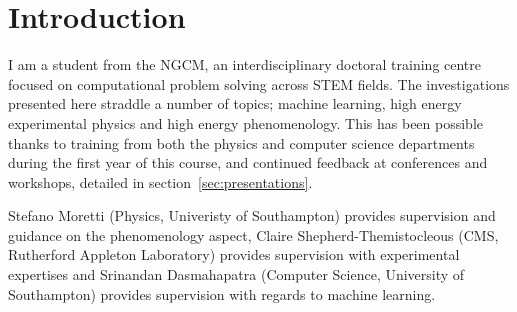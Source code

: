 \section{Introduction}

I am a student from the NGCM,
an interdisciplinary doctoral training centre focused on 
computational problem solving across STEM fields.
The investigations presented here straddle a number of topics; machine learning, high energy experimental physics and high energy phenomenology. 
This has been possible thanks to training
from both the physics and computer science departments
during the first year of this course,
and continued feedback at conferences and workshops, detailed in section~\ref{sec:presentations}.

Stefano Moretti (Physics, Univeristy of Southampton) provides supervision and guidance on the phenomenology aspect,
Claire Shepherd-Themistocleous (CMS, Rutherford Appleton Laboratory) provides supervision with experimental expertises and
Srinandan Dasmahapatra (Computer Science, University of Southampton) provides supervision with regards to machine learning.



